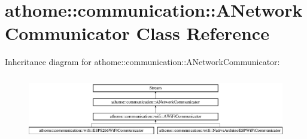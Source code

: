 \hypertarget{classathome_1_1communication_1_1_a_network_communicator}{}\section{athome\+:\+:communication\+:\+:A\+Network\+Communicator Class Reference}
\label{classathome_1_1communication_1_1_a_network_communicator}
Inheritance diagram for athome\+:\+:communication\+:\+:A\+Network\+Communicator\+:\begin{figure}[H]
\begin{center}
\leavevmode
\includegraphics[height=2.871795cm]{classathome_1_1communication_1_1_a_network_communicator}
\end{center}
\end{figure}

